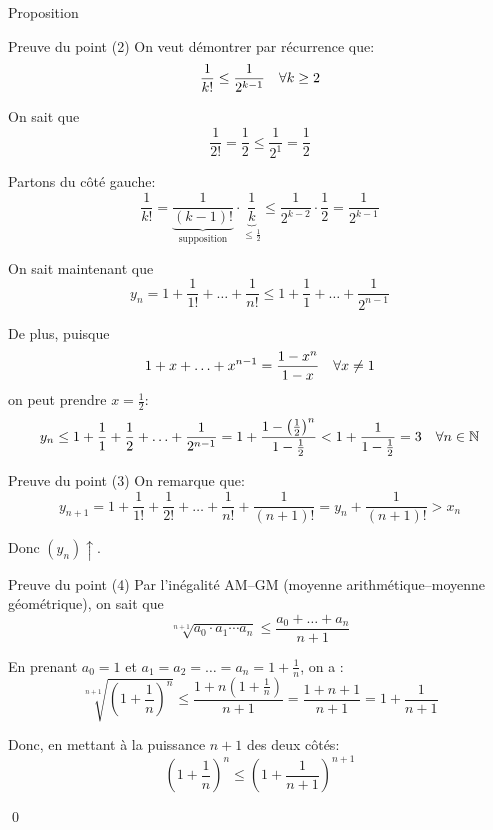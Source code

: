 \documentclass[a4paper]{article}
\begin{document}
\begin{parag}{Proposition}
    \begin{subparag}{Preuve du point (2)}
        On veut démontrer par récurrence que:
        \[\frac{1}{k!} \leq \frac{1}{2^{k - 1}} \quad \forall k \geq 2\]

         On sait que
        \[\frac{1}{2!} = \frac{1}{2} \leq \frac{1}{2^{1}} = \frac{1}{2}\]

         Partons du côté gauche:
        \[\frac{1}{k!} = \underbrace{\frac{1}{\left(k-1\right)!}}_{\text{supposition}} \cdot \underbrace{\frac{1}{k}}_{\leq \frac{1}{2}} \leq \frac{1}{2^{k-2}} \cdot \frac{1}{2} = \frac{1}{2^{k-1}}\]

         On sait maintenant que
        \[y_n = 1 + \frac{1}{1!} + \ldots + \frac{1}{n!} \leq 1 + \frac{1}{1} + \ldots + \frac{1}{2^{n-1}}\]

        De plus, puisque
        \[1 + x + \ldots + x^{n-1} = \frac{1 - x^{n}}{1 - x} \quad \forall x \neq 1\]
        on peut prendre $x = \frac{1}{2}$:
        \[y_n \leq 1 + \frac{1}{1} + \frac{1}{2} + \ldots + \frac{1}{2^{n-1}} = 1 + \frac{1 - \left(\frac{1}{2}\right)^{n}}{1 - \frac{1}{2}} < 1 + \frac{1}{1 - \frac{1}{2}} = 3 \mathspace \forall n \in \mathbb{N}\]
    \end{subparag}

    \begin{subparag}{Preuve du point (3)}
        On remarque que:
        \[y_{n+1} = 1 + \frac{1}{1!} + \frac{1}{2!} + \ldots + \frac{1}{n!} + \frac{1}{\left(n+1\right)!} = y_n + \frac{1}{\left(n+1\right)!} > x_n\]

        Donc $\left(y_n\right)\uparrow$.
    \end{subparag}

    \begin{subparag}{Preuve du point (4)}
        Par l'inégalité AM--GM (moyenne arithmétique--moyenne géométrique), on sait que
        \[\sqrt[n+1]{a_0 \cdot a_1 \cdots a_n} \leq \frac{a_0 + \ldots + a_n}{n + 1}\]

        En prenant $a_0 = 1$ et $a_1 = a_2 = \ldots = a_n = 1 + \frac{1}{n}$, on a :
        \[\sqrt[n+1]{\left(1 + \frac{1}{n}\right)^{n}} \leq \frac{1 + n\left(1 + \frac{1}{n}\right)}{n+1} = \frac{1 + n + 1}{n+1} = 1 + \frac{1}{n+1}\]

        Donc, en mettant à la puissance $n+1$ des deux côtés:
        \[\left(1 + \frac{1}{n}\right)^{n} \leq \left(1 + \frac{1}{n+1}\right)^{n+1}\]

        \qed
    \end{subparag}
\end{parag}
\end{document}
